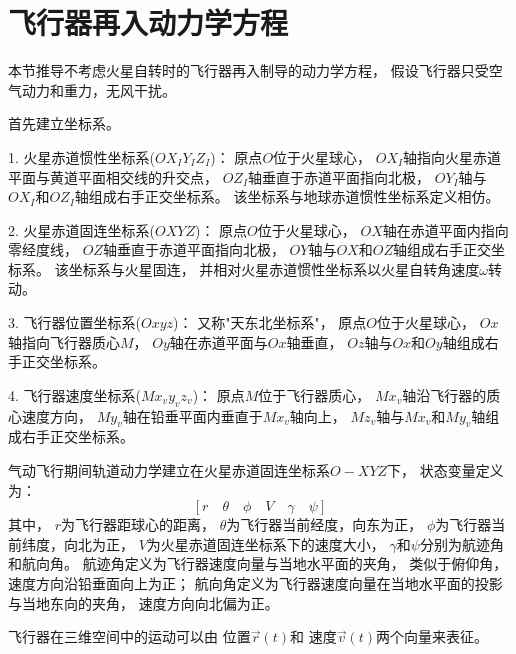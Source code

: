 \section{飞行器再入动力学方程}
本节推导不考虑火星自转时的飞行器再入制导的动力学方程，
假设飞行器只受空气动力和重力，无风干扰。

首先建立坐标系\cite{mdelong2006}。

1. 火星赤道惯性坐标系($OX_IY_IZ_I$)：
原点$O$位于火星球心，
$OX_I$轴指向火星赤道平面与黄道平面相交线的升交点，
$OZ_I$轴垂直于赤道平面指向北极，
$OY_I$轴与$OX_I$和$OZ_I$轴组成右手正交坐标系。
该坐标系与地球赤道惯性坐标系定义相仿。

2. 火星赤道固连坐标系($OXYZ$)：
原点$O$位于火星球心，
$OX$轴在赤道平面内指向零经度线，
$OZ$轴垂直于赤道平面指向北极，
$OY$轴与$OX$和$OZ$轴组成右手正交坐标系。
该坐标系与火星固连，
并相对火星赤道惯性坐标系以火星自转角速度$\omega$转动。

3. 飞行器位置坐标系($Oxyz$)：
又称"天东北坐标系"，
原点$O$位于火星球心，
$Ox$轴指向飞行器质心$M$，
$Oy$轴在赤道平面与$Ox$轴垂直，
$Oz$轴与$Ox$和$Oy$轴组成右手正交坐标系。

4. 飞行器速度坐标系($Mx_vy_vz_v$)：
原点$M$位于飞行器质心，
$Mx_v$轴沿飞行器的质心速度方向，
$My_v$轴在铅垂平面内垂直于$Mx_v$轴向上，
$Mz_v$轴与$Mx_v$和$My_v$轴组成右手正交坐标系。

气动飞行期间轨道动力学建立在火星赤道固连坐标系$O-XYZ$下，
状态变量定义为：
\[[r\quad\theta\quad\phi\quad V\quad\gamma\quad\psi]\]
其中，
$r$为飞行器距球心的距离，
$\theta$为飞行器当前经度，向东为正，
$\phi$为飞行器当前纬度，向北为正，
$V$为火星赤道固连坐标系下的速度大小，
$\gamma$和$\psi$分别为航迹角和航向角。
航迹角定义为飞行器速度向量与当地水平面的夹角，
类似于俯仰角，速度方向沿铅垂面向上为正；
航向角定义为飞行器速度向量在当地水平面的投影与当地东向的夹角，
速度方向向北偏为正。

飞行器在三维空间中的运动可以由
位置$\vec{r}(t)$和
速度$\vec{v}(t)$两个向量来表征。

